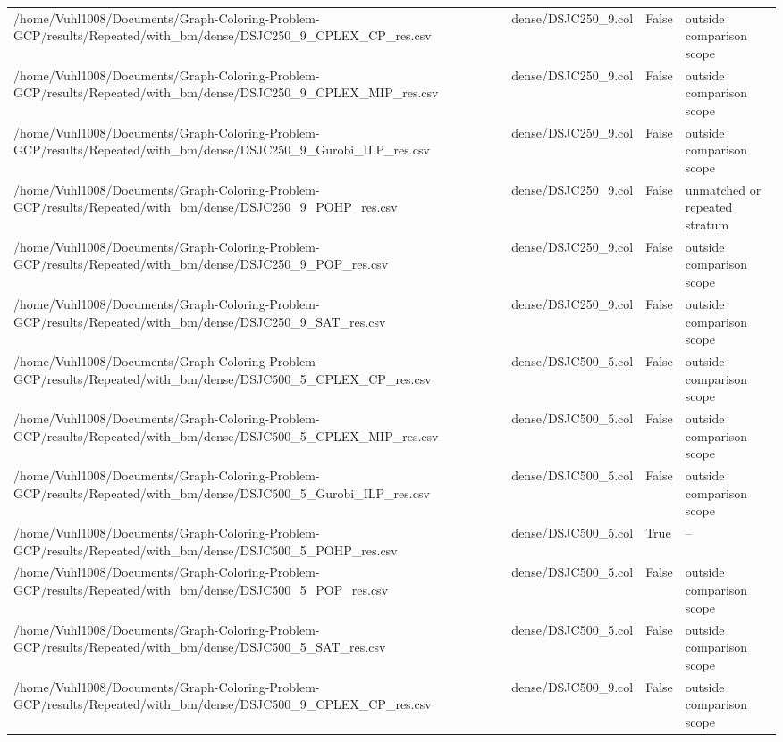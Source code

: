 \begin{table}[htbp]
\begin{tabular}{llll}
/home/Vuhl1008/Documents/Graph-Coloring-Problem-GCP/results/Repeated/with\_bm/dense/DSJC250\_9\_CPLEX\_CP\_res.csv & dense/DSJC250\_9.col & False & outside comparison scope \\
/home/Vuhl1008/Documents/Graph-Coloring-Problem-GCP/results/Repeated/with\_bm/dense/DSJC250\_9\_CPLEX\_MIP\_res.csv & dense/DSJC250\_9.col & False & outside comparison scope \\
/home/Vuhl1008/Documents/Graph-Coloring-Problem-GCP/results/Repeated/with\_bm/dense/DSJC250\_9\_Gurobi\_ILP\_res.csv & dense/DSJC250\_9.col & False & outside comparison scope \\
/home/Vuhl1008/Documents/Graph-Coloring-Problem-GCP/results/Repeated/with\_bm/dense/DSJC250\_9\_POHP\_res.csv & dense/DSJC250\_9.col & False & unmatched or repeated stratum \\
/home/Vuhl1008/Documents/Graph-Coloring-Problem-GCP/results/Repeated/with\_bm/dense/DSJC250\_9\_POP\_res.csv & dense/DSJC250\_9.col & False & outside comparison scope \\
/home/Vuhl1008/Documents/Graph-Coloring-Problem-GCP/results/Repeated/with\_bm/dense/DSJC250\_9\_SAT\_res.csv & dense/DSJC250\_9.col & False & outside comparison scope \\
/home/Vuhl1008/Documents/Graph-Coloring-Problem-GCP/results/Repeated/with\_bm/dense/DSJC500\_5\_CPLEX\_CP\_res.csv & dense/DSJC500\_5.col & False & outside comparison scope \\
/home/Vuhl1008/Documents/Graph-Coloring-Problem-GCP/results/Repeated/with\_bm/dense/DSJC500\_5\_CPLEX\_MIP\_res.csv & dense/DSJC500\_5.col & False & outside comparison scope \\
/home/Vuhl1008/Documents/Graph-Coloring-Problem-GCP/results/Repeated/with\_bm/dense/DSJC500\_5\_Gurobi\_ILP\_res.csv & dense/DSJC500\_5.col & False & outside comparison scope \\
/home/Vuhl1008/Documents/Graph-Coloring-Problem-GCP/results/Repeated/with\_bm/dense/DSJC500\_5\_POHP\_res.csv & dense/DSJC500\_5.col & True & -- \\
/home/Vuhl1008/Documents/Graph-Coloring-Problem-GCP/results/Repeated/with\_bm/dense/DSJC500\_5\_POP\_res.csv & dense/DSJC500\_5.col & False & outside comparison scope \\
/home/Vuhl1008/Documents/Graph-Coloring-Problem-GCP/results/Repeated/with\_bm/dense/DSJC500\_5\_SAT\_res.csv & dense/DSJC500\_5.col & False & outside comparison scope \\
/home/Vuhl1008/Documents/Graph-Coloring-Problem-GCP/results/Repeated/with\_bm/dense/DSJC500\_9\_CPLEX\_CP\_res.csv & dense/DSJC500\_9.col & False & outside comparison scope \\

\end{tabular}
\end{table}
